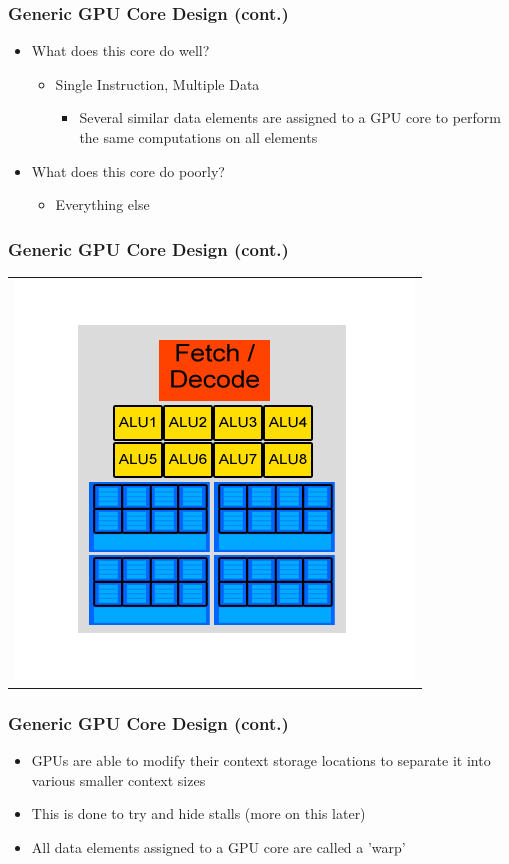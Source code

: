 \documentclass{beamer}
\begin{document}
\begin{frame}
	\frametitle{Generic GPU Core Design (cont.)}
	\begin{itemize}
		\item What does this core do well?
		\begin{itemize}
			\item Single Instruction, Multiple Data
			\begin{itemize}
				\item Several similar data elements are assigned to a GPU core to perform the same computations on all elements
			\end{itemize}
		\end{itemize}
		\item What does this core do poorly?
		\begin{itemize}
			\item Everything else
		\end{itemize}
	\end{itemize}
\end{frame}

\begin{frame}
	\frametitle{Generic GPU Core Design (cont.)}
	\begin{tabular}{c}
		\includegraphics[width=.75\textwidth]{GPU-Design---multiple-contexts.jpg}
	\end{tabular}
\end{frame}

\begin{frame}
	\frametitle{Generic GPU Core Design (cont.)}
	\begin{itemize}
		\item GPUs are able to modify their context storage locations to separate it into various smaller context sizes
		\item This is done to try and hide stalls (more on this later)
		\item All data elements assigned to a GPU core are called a 'warp'
	\end{itemize}
\end{frame}
\end{document}
